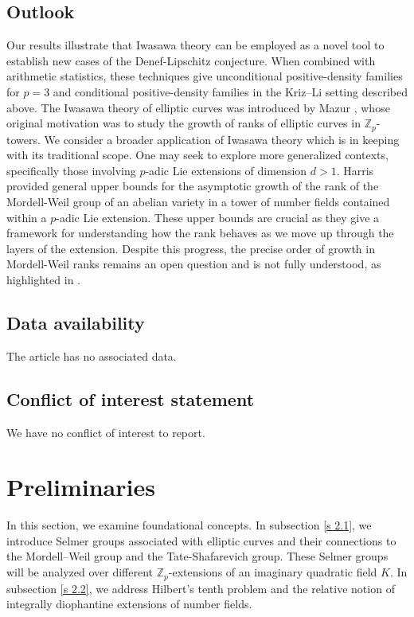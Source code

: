 \documentclass[12pt]{amsart}
\newcommand{\Z}{\mathbb{Z}}
\numberwithin{equation}{section}
\begin{document}
\subsection{Outlook} Our results illustrate that Iwasawa theory can be employed as a novel tool to establish new cases of the Denef-Lipschitz conjecture. When combined with arithmetic statistics, these techniques give unconditional positive-density families for $p=3$ and conditional positive-density families in the Kriz--Li setting described above. The Iwasawa theory of elliptic curves was introduced by Mazur \cite{mazurgrowth}, whose original motivation was to study the growth of ranks of elliptic curves in $\Z_p$-towers. We consider a broader application of Iwasawa theory which is in keeping with its traditional scope. One may seek to explore more generalized contexts, specifically those involving $p$-adic Lie extensions of dimension $d > 1$. Harris \cite{harris2000correction} provided general upper bounds for the asymptotic growth of the rank of the Mordell-Weil group of an abelian variety in a tower of number fields contained within a $p$-adic Lie extension. These upper bounds are crucial as they give a framework for understanding how the rank behaves as we move up through the layers of the extension. Despite this progress, the precise order of growth in Mordell-Weil ranks remains an open question and is not fully understood, as highlighted in \cite[Question following Proposition 4.7]{hung2021growth}.

\subsection*{Data availability} The article has no associated data. 

\subsection*{Conflict of interest statement} We have no conflict of interest to report.


\section{Preliminaries}\label{s 2}
\par In this section, we examine foundational concepts. In subsection \ref{s 2.1}, we introduce Selmer groups associated with elliptic curves and their connections to the Mordell--Weil group and the Tate-Shafarevich group. These Selmer groups will be analyzed over different $\Z_p$-extensions of an imaginary quadratic field $K$. In subsection \ref{s 2.2}, we address Hilbert's tenth problem and the relative notion of integrally diophantine extensions of number fields.
\end{document}
